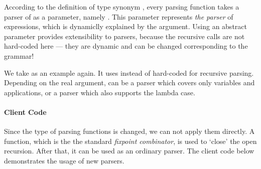 According to the definition of type synonym ,
every parsing function takes a parser of  as a
parameter, namely . This parameter 
represents \emph{the parser} of expressions, which is dynamiclly
explained by the argument. Using an abstract parameter provides
extensibility to parsers, because the recursive calls are not
hard-coded here --- they are dynamic and can be changed corresponding
to the grammar!

We take  as an example again. It uses
 instead of hard-coded  for
recursive parsing. Depending on the real argument, 
can be a parser which covers only variables and applications, or a
parser which also supports the lambda case.

\paragraph{Client Code} Since the type of parsing functions is
changed, we can not apply them directly. A  function, which is the
the standard \textit{fixpoint combinator}, is used to `close' the open
recursion. After that, it can be used as an ordinary parser.
The client code below demonstrates the usage of new parsers.





